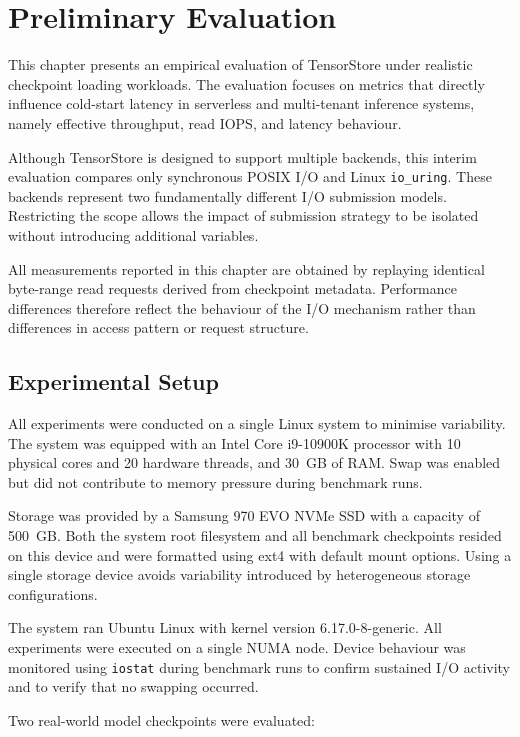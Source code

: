 \documentclass[]{final_report}
\begin{document}
\chapter{Preliminary Evaluation}
\label{chap:evaluation}

This chapter presents an empirical evaluation of TensorStore under realistic checkpoint loading workloads. The evaluation focuses on metrics that directly influence cold-start latency in serverless and multi-tenant inference systems, namely effective throughput, read IOPS, and latency behaviour.

Although TensorStore is designed to support multiple backends, this interim evaluation compares only synchronous POSIX I/O and Linux \texttt{io\_uring}. These backends represent two fundamentally different I/O submission models. Restricting the scope allows the impact of submission strategy to be isolated without introducing additional variables.

All measurements reported in this chapter are obtained by replaying identical byte-range read requests derived from checkpoint metadata. Performance differences therefore reflect the behaviour of the I/O mechanism rather than differences in access pattern or request structure.

\section{Experimental Setup}

All experiments were conducted on a single Linux system to minimise variability. The system was equipped with an Intel Core i9-10900K processor with 10 physical cores and 20 hardware threads, and 30~GB of RAM. Swap was enabled but did not contribute to memory pressure during benchmark runs.

Storage was provided by a Samsung 970 EVO NVMe SSD with a capacity of 500~GB. Both the system root filesystem and all benchmark checkpoints resided on this device and were formatted using ext4 with default mount options. Using a single storage device avoids variability introduced by heterogeneous storage configurations.

The system ran Ubuntu Linux with kernel version 6.17.0-8-generic. All experiments were executed on a single NUMA node. Device behaviour was monitored using \texttt{iostat} during benchmark runs to confirm sustained I/O activity and to verify that no swapping occurred.

Two real-world model checkpoints were evaluated:
\end{document}
